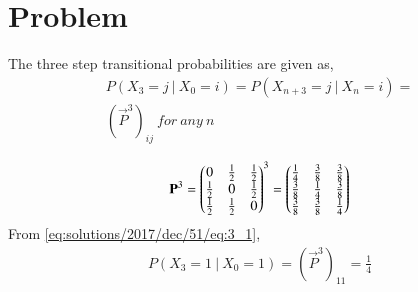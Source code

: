 \section{Problem}
%
%
The three step transitional probabilities are given as,
\begin{align}
    P(X_3 = j \: | \: X_0 = i) = P(X_{n+3} = j \: | \: X_n = i) = \nonumber \\
    (\vec{P}^3)_{ij} \: for \: any \: n
\end{align}

\begin{align} \label{eq:solutions/2017/dec/51/eq:3_1}
    \mathbf{P}^3 = \begin{pmatrix}0 & \frac{1}{2} & \frac{1}{2} \\
    \frac{1}{2} & 0 & \frac{1}{2} \\
    \frac{1}{2} & \frac{1}{2} & 0\end{pmatrix}^3 = 
    \begin{pmatrix}\frac{1}{4} & \frac{3}{8} & \frac{3}{8} \\
    \frac{3}{8} & \frac{1}{4} & \frac{3}{8} \\
    \frac{3}{8} & \frac{3}{8} & \frac{1}{4}\end{pmatrix}
\end{align}
From \eqref{eq:solutions/2017/dec/51/eq:3_1},
\begin{align}
    P(X_3 = 1 \: | \: X_0 = 1) = (\vec{P}^3)_{11} = \frac{1}{4}
\end{align}
